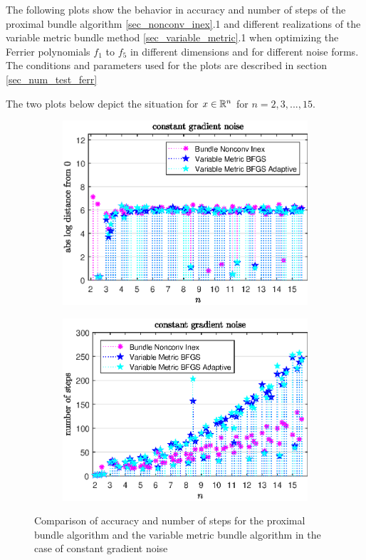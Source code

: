 The following plots show the behavior in accuracy and number of steps of the proximal bundle algorithm \ref{sec_nonconv_inex}.1 and different realizations of the variable metric bundle method \ref{sec_variable_metric}.1 when optimizing the Ferrier polynomials \(f_1\) to \(f_5\) in different dimensions and for different noise forms.
The conditions and parameters used for the plots are described in section \ref{sec_num_test_ferr}

The two plots below depict the situation for \(x \in \mathbb{R}^n\) for \(n = 2,3,...,15\).

\begin{figure}[H]
	\begin{subfigure}{0.49\textwidth}
		\includegraphics[width=\textwidth]{Pictures/Plots/constant_gradient_noise.eps}%
	\end{subfigure}
	\begin{subfigure}{0.49\textwidth}
		\includegraphics[width=\textwidth]{Pictures/Plots/steps_constant_gradient_noise.eps}%
	\end{subfigure}
	\caption[Accuracy and number of steps for: constant gradient noise]{Comparison of accuracy and number of steps for the proximal bundle algorithm and the variable metric bundle algorithm in the case of constant gradient noise}%
	\label{fig_const_grad_noise}%
\end{figure}

